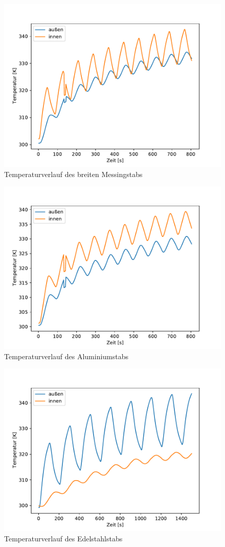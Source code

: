\begin{figure}[!htbp]
  \centering
  \includegraphics{content/dyn_80_mess.pdf}
  \caption{Temperaturverlauf des breiten Messingstabs}
  \label{fig:mess_dyn}
\end{figure}

\begin{figure}[!htbp]
  \centering
  \includegraphics{content/dyn_80_alu.pdf}
  \caption{Temperaturverlauf des Aluminiumstabs}
  \label{fig:alu_dyn}
\end{figure}

\begin{figure}[!htbp]
  \centering
  \includegraphics{content/dyn_2.pdf}
  \caption{Temperaturverlauf des Edelstahlstabs}
  \label{fig:edel_dyn}
\end{figure}



